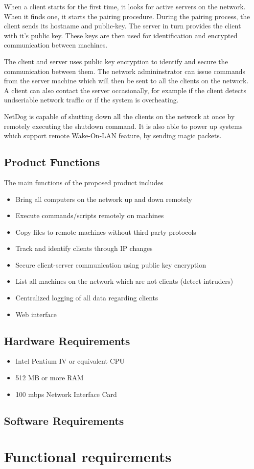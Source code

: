 When a client starts for the first time, it looks for active servers on the
network. When it finds one, it starts the pairing procedure. During the pairing
process, the client sends its hostname and public-key. The server in turn
provides the client with it's public key. These keys are then used for
identification and encrypted communication between machines.

The client and server uses public key encryption to identify and secure the
communication between them. The network admininstrator can issue commands from
the server machine which will then be sent to all the clients on the network.
A client can also contact the server occasionally, for example if the client
detects undseriable network traffic or if the system is overheating.

NetDog is capable of shutting down all the clients on the network at once by
remotely executing the shutdown command. It is also able to power up systems
which support remote Wake-On-LAN feature, by sending magic packets.

\subsection{Product Functions}
The main functions of the proposed product includes \\

\begin{itemize}
    \item Bring all computers on the network up and down remotely
    \item Execute commands/scripts remotely on machines
    \item Copy files to remote machines without third party protocols
    \item Track and identify clients through IP changes
    \item Secure client-server communication using public key encryption
    \item List all machines on the network which are not clients (detect intruders)
    \item Centralized logging of all data regarding clients
    \item Web interface
\end{itemize}

\subsection{Hardware Requirements}
\begin{itemize}
    \item Intel Pentium IV or equivalent CPU
    \item 512 MB or more RAM
    \item 100 mbps Network Interface Card
\end{itemize}

\subsection{Software Requirements}

\section{Functional requirements}

